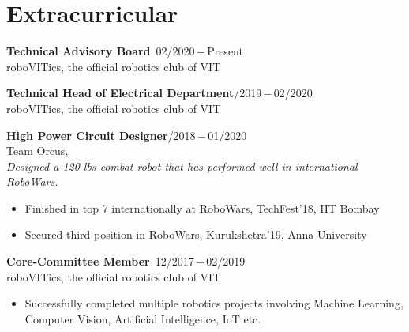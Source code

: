 \documentclass[a4paper, 12pt]{article}
\begin{document}
	
	\section*{Extracurricular}
    \begin{flushleft}
        \textbf{Technical Advisory Board}\qquad\qquad\qquad\qquad\qquad\qquad\qquad\qquad\qquad\quad\qquad\qquad\,\,\,02/2020\,$-$\,Present\\
        roboVITics, the official robotics club of VIT
    \end{flushleft}
    
    \begin{flushleft}
        \textbf{Technical Head of Electrical Department}\qquad\qquad\qquad\qquad\qquad\qquad\qquad{}/2019\,$-$\,02/2020\\
        roboVITics, the official robotics club of VIT
    \end{flushleft}
    
    \begin{flushleft}
        \textbf{High Power Circuit Designer}\qquad\qquad\qquad\qquad\qquad\qquad\qquad\qquad\qquad\qquad{}/2018\,$-$\,01/2020\\ Team Orcus, \\
        \textit{Designed a 120 lbs combat robot that has performed well in international RoboWars.}\\
        \begin{itemize}
            \item Finished in top 7 internationally at RoboWars, TechFest'18, IIT Bombay\\
            \item Secured third position in RoboWars, Kurukshetra'19, Anna University
        \end{itemize}
    \end{flushleft}
    
    \begin{flushleft}
        \textbf{Core-Committee Member}\qquad\qquad\qquad\qquad\qquad\qquad\qquad\qquad\qquad\quad\qquad\qquad\,\,\,12/2017\,$-$\,02/2019\\
        roboVITics, the official robotics club of VIT
        \begin{itemize}
            \item Successfully completed multiple robotics projects involving Machine Learning, Computer Vision, Artificial Intelligence, IoT etc.
        \end{itemize}
    \end{flushleft}
	
\end{document}
